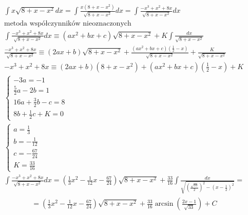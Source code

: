 \begin{gather*}\int x\sqrt{8+x-x^2}dx = \int \frac{x(8+x-x^2)}{\sqrt{8+x-x^2}}dx = \int \frac{-x^3+x^2+8x}{\sqrt{8+x-x^2}}dx \\
  \text{metoda współczynników nieoznaczonych} \\
  \int \frac{-x^3+x^2+8x}{\sqrt{8+x-x^2}}dx \equiv (ax^2+bx+c)\sqrt{8+x-x^2} + K\int \frac{dx}{\sqrt{8+x-x^2}} \\
\frac{-x^3+x^2+8x}{\sqrt{8+x-x^2}} \equiv (2ax+b)\sqrt{8+x-x^2}+\frac{(ax^2+bx+c)(\frac{1}{2}-x)}{\sqrt{8+x-x^2}} + \frac{K}{\sqrt{8+x-x^2}} \\
-x^3+x^2+8x \equiv (2ax+b)(8+x-x^2)+(ax^2+bx+c)(\frac{1}{2}-x)+K \\
\begin{cases} -3a=-1 \\ \frac{5}{2}a-2b=1 \\ 16a+\frac{3}{2}b-c=8 \\ 8b+\frac{1}{2}c+K=0 \end{cases} \\
\begin{cases} a=\frac{1}{3} \\ b=-\frac{1}{12} \\ c=-\frac{67}{24} \\ K=\frac{33}{16} \end{cases} \\
\int \frac{-x^3+x^2+8x}{\sqrt{8+x-x^2}}dx = (\frac{1}{3}x^2-\frac{1}{12}x-\frac{67}{24})\sqrt{8+x-x^2} + \frac{33}{16}\int \frac{dx}{\sqrt{(\frac{\sqrt{33}}{2})^2-(x-\frac{1}{2})^2}} = \end{gather*}
\begin{gather*}= (\frac{1}{3}x^2-\frac{1}{12}x-\frac{67}{24})\sqrt{8+x-x^2} + \frac{33}{16}\arcsin \left(\frac{2x-1}{\sqrt{33}}\right)+C\end{gather*}



